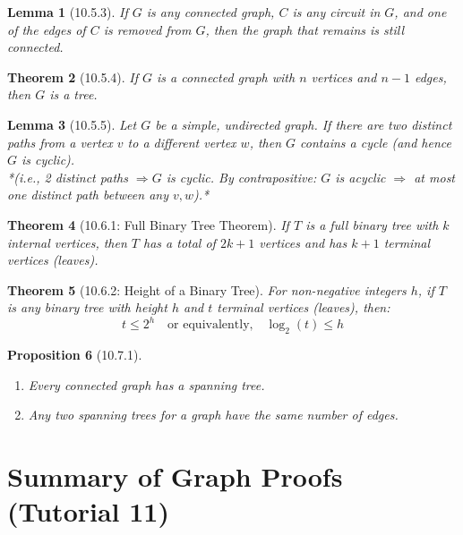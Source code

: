 \documentclass{article}
\theoremstyle{plain}
\newtheorem{theorem}{Theorem}[section]
\newtheorem{lemma}[theorem]{Lemma}
\newtheorem{proposition}[theorem]{Proposition}
\theoremstyle{definition}
\theoremstyle{remark}
\begin{document}
\begin{lemma}[10.5.3]
    If $G$ is any connected graph, $C$ is any circuit in $G$, and one of the edges of $C$ is removed from $G$, then the graph that remains is still connected.
\end{lemma}

\begin{theorem}[10.5.4]
    If $G$ is a connected graph with $n$ vertices and $n - 1$ edges, then $G$ is a tree.
\end{theorem}

\begin{lemma}[10.5.5]
    Let $G$ be a simple, undirected graph. If there are two distinct paths from a vertex $v$ to a different vertex $w$, then $G$ contains a cycle (and hence $G$ is cyclic).
    \\ *(i.e., 2 distinct paths $\Rightarrow G$ is cyclic. By contrapositive: $G$ is acyclic $\Rightarrow$ at most one distinct path between any $v, w$).*
\end{lemma}

\begin{theorem}[10.6.1: Full Binary Tree Theorem]
    If $T$ is a full binary tree with $k$ internal vertices, then $T$ has a total of $2k + 1$ vertices and has $k + 1$ terminal vertices (leaves).
\end{theorem}

\begin{theorem}[10.6.2: Height of a Binary Tree]
    For non-negative integers $h$, if $T$ is any binary tree with height $h$ and $t$ terminal vertices (leaves), then:
    \[ t \leq 2^h \quad \text{or equivalently,} \quad \log_2(t) \leq h \]
\end{theorem}

\begin{proposition}[10.7.1]
    \hfill
    \begin{enumerate}
        \item Every connected graph has a spanning tree.
        \item Any two spanning trees for a graph have the same number of edges.
    \end{enumerate}
\end{proposition}

\section{Summary of Graph Proofs (Tutorial 11)}
\end{document}
